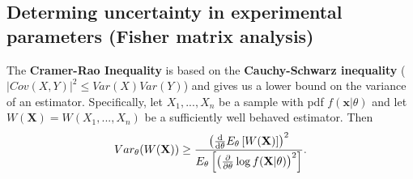 \documentclass[11pt]{article} %
\DeclareRobustCommand{\d}{\ifmmode\text{d}\else d\fi}
\newcommand{\br}[1]{\ensuremath{\left( #1 \right)}}
\newcommand{\sbr}[1]{\ensuremath{\left[ #1 \right]}}
\begin{document}
\subsection{Determing uncertainty in experimental parameters (Fisher matrix analysis)}
The \textbf{Cramer-Rao Inequality} is based on the \textbf{Cauchy-Schwarz inequality} ($|Cov(X,Y)|^2\leq Var(X)Var(Y)$) and gives us a lower bound on the variance of an estimator. Specifically, let $X_1, ..., X_n$ be a sample with pdf $f(\mathbf x | \theta)$ and let $W(\mathbf X)=W(X_1, ..., X_n)$ be a sufficiently well behaved estimator. Then
\begin{equation}
    Var_\theta(W(\mathbf X)) \geq \frac{\br{\frac{\d}{\d\theta}E_\theta \sbr{ W(\mathbf X) }}^2}{E_\theta\sbr{\br{\frac{\partial}{\partial\theta}\log f(\mathbf X | \theta)}^2}}. \label{eq:cramerraobound}
\end{equation}
\end{document}

